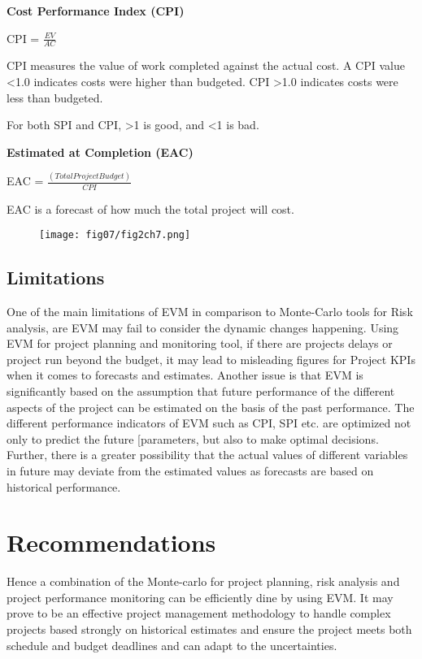\textbf{Cost Performance Index (CPI)} 

CPI =  $\frac{EV}{AC}$

CPI measures the value of work completed against the actual cost. A CPI value <1.0 indicates costs were higher than budgeted. CPI >1.0 indicates costs were less than budgeted.

For both SPI and CPI, >1 is good, and <1 is bad. 

\textbf{Estimated at Completion (EAC)} 

EAC = $\frac{(Total Project Budget)}{CPI}$

EAC is a forecast of how much the total project will cost.

\begin{figure}
	\centering
	\texttt{[image: fig07/fig2ch7.png]}
	\label{img15ch7}
\end{figure}


\subsection {Limitations} 

One of the main limitations of EVM in comparison to Monte-Carlo tools for Risk analysis, are EVM may fail to consider the dynamic changes happening.
Using EVM for project planning and monitoring tool, if there are projects delays or project run beyond the budget, it may lead to misleading figures for Project KPIs when it comes to forecasts and estimates. Another issue is that EVM is significantly based on the assumption that future performance of the different aspects of the project can be estimated on the basis of the past performance. The different performance indicators of EVM such as CPI, SPI etc. are optimized not only to predict the future [parameters, but also to make optimal decisions. Further, there is a greater possibility that the actual values of different variables in future may deviate from the estimated values as forecasts are based on historical performance.

\section{Recommendations}

Hence a combination of the Monte-carlo for project planning, risk analysis and project performance monitoring can be efficiently dine by using EVM.
It may prove to be an effective project management methodology to handle complex projects based strongly on historical estimates and ensure the project meets both schedule and budget deadlines and can adapt to the uncertainties.



